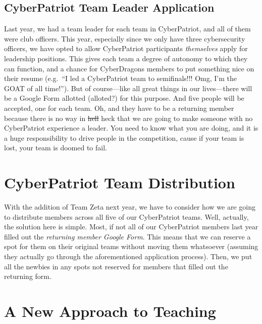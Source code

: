 \documentclass[
  letterpaper,
  DIV=11,
  numbers=noendperiod]{scrartcl}
\begin{document}
\hypertarget{cyberpatriot-team-leader-application}{%
\subsection{CyberPatriot Team Leader
Application}\label{cyberpatriot-team-leader-application}}

Last year, we had a team leader for each team in CyberPatriot, and all
of them were club officers. This year, especially since we only have
three cybersecurity officers, we have opted to allow CyberPatriot
participants \emph{themselves} apply for leadership positions. This
gives each team a degree of autonomy to which they can function, and a
chance for CyberDragons members to put something nice on their resume
(e.g.~``I led a CyberPatriot team to semifinals!!! Omg, I'm the GOAT of
all time!''). But of course---like all great things in our lives---there
will be a Google Form allotted (alloted?) for this purpose. And five
people will be accepted, one for each team. Oh, and they have to be a
returning member because there is no way in \st{hell} heck that we are
going to make someone with no CyberPatriot experience a leader. You need
to know what you are doing, and it is a huge responsibility to drive
people in the competition, cause if your team is lost, your team is
doomed to fail.

\hypertarget{cyberpatriot-team-distribution}{%
\section{CyberPatriot Team
Distribution}\label{cyberpatriot-team-distribution}}

With the addition of Team Zeta next year, we have to consider how we are
going to distribute members across all five of our CyberPatriot teams.
Well, actually, the solution here is simple. Most, if not all of our
CyberPatriot members last year filled out the \emph{returning member
Google Form}. This means that we can reserve a spot for them on their
original teams without moving them whatsoever (assuming they actually go
through the aforementioned application process). Then, we put all the
newbies in any spots not reserved for members that filled out the
returning form.

\hypertarget{a-new-approach-to-teaching}{%
\section{A New Approach to Teaching}\label{a-new-approach-to-teaching}}
\end{document}
